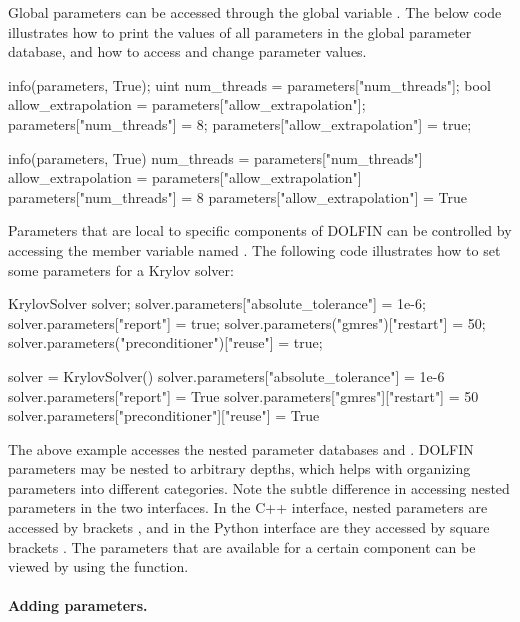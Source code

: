 Global parameters can be accessed through the global variable
. The below code illustrates how to print the values of
all parameters in the global parameter database, and how to access and
change parameter values.
\begin{c++}
info(parameters, True);
uint num_threads = parameters["num_threads"];
bool allow_extrapolation = parameters["allow_extrapolation"];
parameters["num_threads"] = 8;
parameters["allow_extrapolation"] = true;
\end{c++}
\begin{python}
info(parameters, True)
num_threads = parameters["num_threads"]
allow_extrapolation = parameters["allow_extrapolation"]
parameters["num_threads"] = 8
parameters["allow_extrapolation"] = True
\end{python}
Parameters that are local to specific components of DOLFIN can be
controlled by accessing the member variable named . The
following code illustrates how to set some parameters for a Krylov solver:
\begin{c++}
KrylovSolver solver;
solver.parameters["absolute_tolerance"] = 1e-6;
solver.parameters["report"] = true;
solver.parameters("gmres")["restart"] = 50;
solver.parameters("preconditioner")["reuse"] = true;
\end{c++}
\begin{python}
solver = KrylovSolver()
solver.parameters["absolute_tolerance"] = 1e-6
solver.parameters["report"] = True
solver.parameters["gmres"]["restart"] = 50
solver.parameters["preconditioner"]["reuse"] = True
\end{python}
The above example accesses the nested parameter databases 
and . DOLFIN parameters may be nested to
arbitrary depths, which helps with organizing parameters into different
categories. Note the subtle difference in accessing nested parameters in
the two interfaces. In the C++ interface, nested parameters are accessed
by brackets , and in the Python interface are they accessed
by square brackets \emp{["..."]}. The parameters that are available for
a certain component can be viewed by using the  function.

\paragraph{Adding parameters.}


